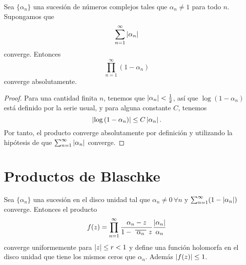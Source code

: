 \begin{lemma}
    \label{convergencia}
    Sea $\{\alpha_n\}$ una sucesión de números complejos tales que $\alpha_n \not = 1$ para todo $n$. Supongamos que
    \begin{equation*}
        \sum_{n=1}^{\infty} \left\lvert\alpha_n\right\rvert
    \end{equation*}
    converge. Entonces
    \begin{equation*}
        \prod_{n=1}^{\infty} (1 - \alpha_n)
    \end{equation*}
    converge absolutamente.
\end{lemma}

\begin{proof}
    Para una cantidad finita $n$, tenemos que $\left\lvert\alpha_n\right\rvert < \frac{1}{2}$, así que $\log{(1 - \alpha_n)}$ está definido por la serie usual, y para alguna constante $C$, tenemos
    \begin{equation*}
        \left\lvert\log{(1 - \alpha_n)}\right\rvert \leq C \left\lvert\alpha_n\right\rvert.
    \end{equation*}
    Por tanto, el producto converge absolutamente por definición y utilizando la hipótesis de que $\sum_{n=1}^{\infty} \left\lvert\alpha_n\right\rvert$ converge.
\end{proof}


\section{Productos de Blaschke}

\begin{prop}
    Sea $\{\alpha_n\}$ una sucesión en el disco unidad tal que $\alpha_n \not = 0 \, \forall n$ y $\sum_{n=1}^{\infty} (1 - \left\lvert\alpha_n\right\rvert)$ converge. Entonces el producto
    \begin{equation*}
        f(z) = \prod_{n=1}^{\infty} \frac{\alpha_n - z}{1 - \xbar{\alpha_n}z} \dfrac{\abs{\alpha_n}}{\alpha_n}
    \end{equation*}
    converge uniformemente para $\left\lvert z\right\rvert \leq r < 1$ y define una función holomorfa en el disco unidad que tiene los mismos ceros que $\alpha_n$. Además $\left\lvert f(z)\right\rvert \leq 1$.
\end{prop}

